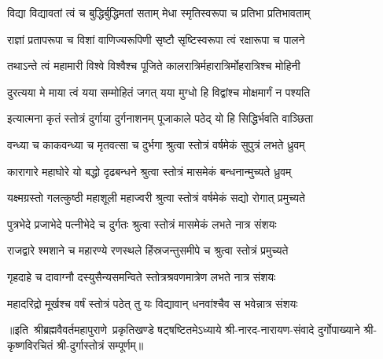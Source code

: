 \twolineshloka
{विद्या विद्यावतां त्वं च बुद्धिर्बुद्धिमतां सताम्}
{मेधा स्मृतिस्वरूपा च प्रतिभा प्रतिभावताम्}

\twolineshloka
{राज्ञां प्रतापरूपा च विशां वाणिज्यरूपिणी}
{सृष्टौ सृष्टिस्वरूपा त्वं रक्षारूपा च पालने}

\twolineshloka
{तथाऽन्ते त्वं महामारी विश्वे विश्वैश्च पूजिते}
{कालरात्रिर्महारात्रिर्मोहरात्रिश्च मोहिनी}

\twolineshloka
{दुरत्यया मे माया त्वं यया सम्मोहितं जगत्}
{यया मुग्धो हि विद्वांश्च मोक्षमार्गं न पश्यति}


\twolineshloka
{इत्यात्मना कृतं स्तोत्रं दुर्गाया दुर्गनाशनम्}
{पूजाकाले पठेद् यो हि सिद्धिर्भवति वाञ्छिता}

\twolineshloka
{वन्ध्या च काकवन्ध्या च मृतवत्सा च दुर्भगा}
{श्रुत्वा स्तोत्रं वर्षमेकं सुपुत्रं लभते ध्रुवम्}

\twolineshloka
{कारागारे महाघोरे यो बद्धो दृढबन्धने}
{श्रुत्वा स्तोत्रं मासमेकं बन्धनान्मुच्यते ध्रुवम्}

\twolineshloka
{यक्ष्मग्रस्तो गलत्कुष्ठी महाशूली महाज्वरी}
{श्रुत्वा स्तोत्रं वर्षमेकं सद्यो रोगात् प्रमुच्यते}

\twolineshloka
{पुत्रभेदे प्रजाभेदे पत्‍‌नीभेदे च दुर्गतः}
{श्रुत्वा स्तोत्रं मासमेकं लभते नात्र संशयः}

\twolineshloka
{राजद्वारे श्मशाने च महारण्ये रणस्थले}
{हिंस्रजन्तुसमीपे च श्रुत्वा स्तोत्रं प्रमुच्यते}

\twolineshloka
{गृहदाहे च दावाग्नौ दस्युसैन्यसमन्विते}
{स्तोत्रश्रवणमात्रेण लभते नात्र संशयः}

\twolineshloka
{महादरिद्रो मूर्खश्च वर्षं स्तोत्रं पठेत् तु यः}
{विद्यावान् धनवांश्चैव स भवेन्नात्र संशयः}

{॥इति~श्रीब्रह्मवैवर्तमहापुराणे~प्रकृतिखण्डे षट्षष्टितमेऽध्याये श्री-नारद-नारायण-संवादे दुर्गोपाख्याने श्री-कृष्णविरचितं श्री-दुर्गास्तोत्रं सम्पूर्णम्॥}